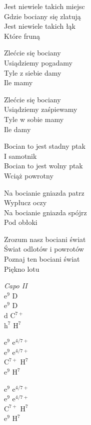 \begin{text}
    \chordfill
    Jest niewiele takich miejsc\\
    Gdzie bociany się zlatują\\
    Jest niewiele takich łąk\\
    Które fruną

    \vin Zlećcie się bociany\\
    \vin Usiądziemy pogadamy\\
    \vin Tyle z siebie damy\\
    \vin Ile mamy

    \vin Zlećcie się bociany\\
    \vin Usiądziemy zaśpiewamy\\
    \vin Tyle w sobie mamy\\
    \vin Ile damy

    Bocian to jest stadny ptak\\
    I samotnik\\
    Bocian to jest wolny ptak\\
    Wciąż powrotny

    Na bocianie gniazda patrz\\
    Wypłucz oczy\\
    Na bocianie gniazda spójrz\\
    Pod obłoki

    Zrozum nasz bociani świat\\
    Świat odlotów i powrotów\\
    Poznaj ten bociani świat\\
    Piękno lotu
\end{text}
\begin{chord}
    \textit{Capo II}\\
    $\mathrm{e^9}$ D\\
    $\mathrm{e^9}$ D\\
    d $\mathrm{C^{7+}}$\\
    $\mathrm{h^7}$ $\mathrm{H^7}$

    $\mathrm{e^9}$ $\mathrm{e^{4/7+}}$\\
    $\mathrm{e^9}$ $\mathrm{e^{4/7+}}$\\
    $\mathrm{C^{7+}}$ $\mathrm{H^7}$\\
    $\mathrm{e^9}$ $\mathrm{H^7}$

    $\mathrm{e^9}$ $\mathrm{e^{4/7+}}$\\
    $\mathrm{e^9}$ $\mathrm{e^{4/7+}}$\\
    $\mathrm{C^{7+}}$ $\mathrm{H^7}$\\
    $\mathrm{e^9}$ $\mathrm{H^7}$
\end{chord}
